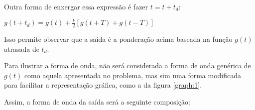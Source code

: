 Outra forma de enxergar essa expressão é fazer $t=t+t_d$:

\begin{center}
    $y(t+t_d) = g(t) + \frac{k}{2} [g(t+T) + g(t-T)]$
\end{center}

Isso permite observar que a saída é a ponderação acima baseada na função $g(t)$ atrasada de $t_d$.

Para ilustrar a forma de onda, não será considerada a forma de onda genérica de $g(t)$ como aquela apresentada no problema, mas sim uma forma modificada para facilitar a representação gráfica, como a da figura \ref{graph:1}.



Assim, a forma de onda da saída será a seguinte composição:





